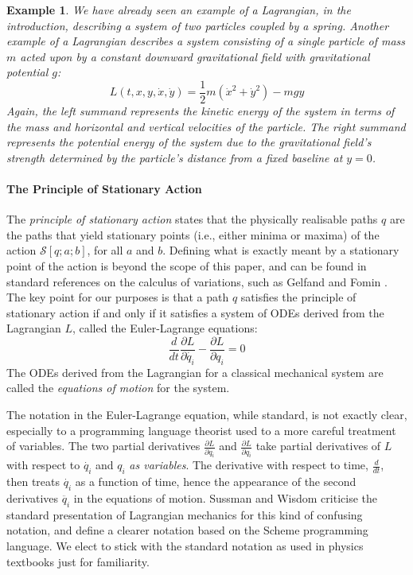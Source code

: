 \documentclass{sigplanconf}
\theoremstyle{examplestyle}
\newtheorem{example}{Example}
\begin{document}
\begin{example}
  We have already seen an example of a Lagrangian, in the
  introduction, describing a system of two particles coupled by a
  spring. Another example of a Lagrangian describes a system
  consisting of a single particle of mass $m$ acted upon by a constant
  downward gravitational field with gravitational potential $g$:
  \begin{equation}\label{eq:simple-g-lagrangian}
    L(t,x,y,\dot{x},\dot{y}) = \frac{1}{2}m(\dot{x}^2 + \dot{y}^2) - mgy
  \end{equation}
  Again, the left summand represents the kinetic energy of the system
  in terms of the mass and horizontal and vertical velocities of the
  particle. The right summand represents the potential energy of the
  system due to the gravitational field's strength determined by the
  particle's distance from a fixed baseline at $y = 0$.
\end{example}

\paragraph{The Principle of Stationary Action}

The \emph{principle of stationary action} states that the physically
realisable paths $q$ are the paths that yield stationary points (i.e.,
either minima or maxima) of the action $\mathcal{S}[q;a;b]$, for all
$a$ and $b$. Defining what is exactly meant by a stationary point of
the action is beyond the scope of this paper, and can be found in
standard references on the calculus of variations, such as Gelfand and
Fomin \cite{gelfand00calculus}. The key point for our purposes is that
a path $q$ satisfies the principle of stationary action if and only if
it satisfies a system of ODEs derived from the Lagrangian $L$, called
the Euler-Lagrange equations:
\begin{equation}\label{eq:euler-lagrange}
  \frac{d}{dt}\frac{\partial L}{\partial \dot{q_i}} - \frac{\partial L}{\partial q_i} = 0
\end{equation}
The ODEs derived from the Lagrangian for a classical mechanical system
are called the \emph{equations of motion} for the system.

The notation in the Euler-Lagrange equation, while standard, is not
exactly clear, especially to a programming language theorist used to a
more careful treatment of variables. The two partial derivatives
$\frac{\partial L}{\partial \dot{q_i}}$ and $\frac{\partial
  L}{\partial q_i}$ take partial derivatives of $L$ with respect to
$\dot{q_i}$ and $q_i$ \emph{as variables}. The derivative with respect
to time, $\frac{d}{dt}$, then treats $\dot{q_i}$ as a function of
time, hence the appearance of the second derivatives $\ddot{q_i}$ in
the equations of motion. Sussman and Wisdom \cite{sussman01structure}
criticise the standard presentation of Lagrangian mechanics for this
kind of confusing notation, and define a clearer notation based on the
Scheme programming language. We elect to stick with the standard
notation as used in physics textbooks just for familiarity.
\end{document}
